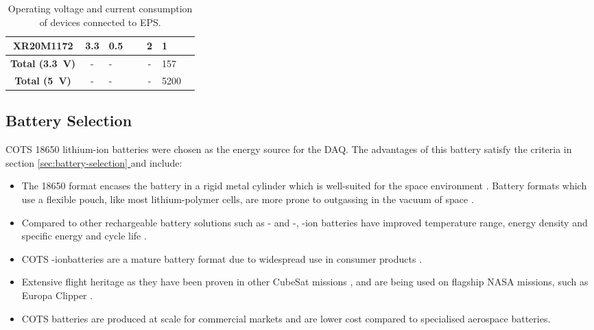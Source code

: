 \documentclass{report}
\newcommand*{\secref}[1]{section \hyperref[{#1}]{\ref*{#1} \nameref*{#1}}}
\newcommand{\liion}{\ce{Li}-ion}
\begin{document}
\begin{table}[H]
\begin{tabular}{|c|c|L{0.2\linewidth}|c|L{0.2\linewidth}|}
    XR20M1172                        & 3.3                           & 0.5 \cite{maxlinear2022xr20m1172}              & 2                 & 1                                         \\
    \hline
    \textbf{Total (\SI{3.3}{\volt})} & -                             & -                                              & -                 & 157                                       \\
    \textbf{Total (\SI{5}{\volt})}   & -                             & -                                              & -                 & 5200                                      \\
    \hline
  \end{tabular}
  \caption{Operating voltage and current consumption of devices connected to EPS.}
  \label{tabl:eps-power-budget-final}
\end{table}

\subsection{Battery Selection}

COTS 18650 lithium-ion batteries were chosen as the energy source for the DAQ. The advantages of this battery satisfy the criteria in \secref{sec:battery-selection} and include:

\begin{itemize}
  \item The 18650 format encases the battery in a rigid metal cylinder which is well-suited for the space environment \cite{knap2020review}. Battery formats which use a flexible pouch, like most lithium-polymer cells, are more prone to outgassing in the vacuum of space \cite{knap2020review}.
  \item Compared to other rechargeable battery solutions such as - and -, -ion batteries have improved temperature range, energy density and specific energy and cycle life \cite{pathak2023review}.
  \item COTS \liion batteries are a mature battery format due to widespread use in consumer products \cite{pathak2023review}.
  \item Extensive flight heritage as they have been proven in other CubeSat missions \cite{knap2020review}, and are being used on flagship NASA missions, such as Europa Clipper \cite{krause2021performance}.
  \item COTS batteries are produced at scale for commercial markets and are lower cost compared to specialised aerospace batteries.
\end{itemize}
\end{document}
